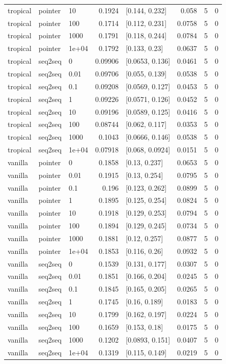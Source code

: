 \documentclass[10pt]{article}
\begin{document}
{\begin{longtable}{lllrlrrr}
tropical & pointer & 10 & 0.1924 & [0.144, 0.232] & 0.058 & 5 & 0\\
tropical & pointer & 100 & 0.1714 & [0.112, 0.231] & 0.0758 & 5 & 0\\
tropical & pointer & 1000 & 0.1791 & [0.118, 0.244] & 0.0784 & 5 & 0\\
tropical & pointer & 1e+04 & 0.1792 & [0.133, 0.23] & 0.0637 & 5 & 0\\
tropical & seq2seq & 0 & 0.09906 & [0.0653, 0.136] & 0.0461 & 5 & 0\\
tropical & seq2seq & 0.01 & 0.09706 & [0.055, 0.139] & 0.0538 & 5 & 0\\
tropical & seq2seq & 0.1 & 0.09208 & [0.0569, 0.127] & 0.0453 & 5 & 0\\
tropical & seq2seq & 1 & 0.09226 & [0.0571, 0.126] & 0.0452 & 5 & 0\\
tropical & seq2seq & 10 & 0.09196 & [0.0589, 0.125] & 0.0416 & 5 & 0\\
tropical & seq2seq & 100 & 0.08744 & [0.062, 0.117] & 0.0353 & 5 & 0\\
tropical & seq2seq & 1000 & 0.1043 & [0.0666, 0.146] & 0.0538 & 5 & 0\\
tropical & seq2seq & 1e+04 & 0.07918 & [0.068, 0.0924] & 0.0151 & 5 & 0\\
vanilla & pointer & 0 & 0.1858 & [0.13, 0.237] & 0.0653 & 5 & 0\\
vanilla & pointer & 0.01 & 0.1915 & [0.13, 0.254] & 0.0795 & 5 & 0\\
vanilla & pointer & 0.1 & 0.196 & [0.123, 0.262] & 0.0899 & 5 & 0\\
vanilla & pointer & 1 & 0.1895 & [0.125, 0.254] & 0.0824 & 5 & 0\\
vanilla & pointer & 10 & 0.1918 & [0.129, 0.253] & 0.0794 & 5 & 0\\
vanilla & pointer & 100 & 0.1894 & [0.129, 0.245] & 0.0734 & 5 & 0\\
vanilla & pointer & 1000 & 0.1881 & [0.12, 0.257] & 0.0877 & 5 & 0\\
vanilla & pointer & 1e+04 & 0.1853 & [0.116, 0.26] & 0.0932 & 5 & 0\\
vanilla & seq2seq & 0 & 0.1539 & [0.131, 0.177] & 0.0307 & 5 & 0\\
vanilla & seq2seq & 0.01 & 0.1851 & [0.166, 0.204] & 0.0245 & 5 & 0\\
vanilla & seq2seq & 0.1 & 0.1845 & [0.165, 0.205] & 0.0265 & 5 & 0\\
vanilla & seq2seq & 1 & 0.1745 & [0.16, 0.189] & 0.0183 & 5 & 0\\
vanilla & seq2seq & 10 & 0.1799 & [0.162, 0.197] & 0.0224 & 5 & 0\\
vanilla & seq2seq & 100 & 0.1659 & [0.153, 0.18] & 0.0175 & 5 & 0\\
vanilla & seq2seq & 1000 & 0.1202 & [0.0893, 0.151] & 0.0407 & 5 & 0\\
vanilla & seq2seq & 1e+04 & 0.1319 & [0.115, 0.149] & 0.0219 & 5 & 0\\
\bottomrule
\end{longtable}
}
\end{document}
